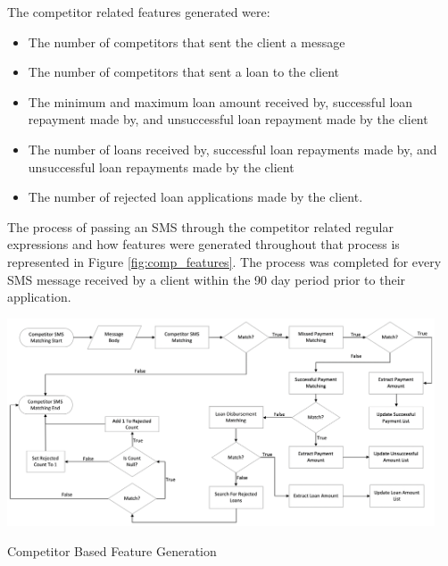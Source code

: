 \vspace{15pt}

\newpage

The competitor related features generated were:

\begin{itemize}
    \item The number of competitors that sent the client a message
    \item The number of competitors that sent a loan to the client
    \item The minimum and maximum loan amount received by, successful loan repayment made by, and unsuccessful loan repayment made by the client
    \item The number of loans received by, successful loan repayments made by, and unsuccessful loan repayments made by the client
    \item The number of rejected loan applications made by the client. 
\end{itemize}

\vspace{15pt}

The process of passing an SMS through the competitor related regular expressions and how features were generated throughout that process is represented in Figure \ref{fig:comp_features}. The process was completed for every SMS message received by a client within the 90 day period prior to their application. 

\vspace{15pt}

\begin{Figure}[!htb]
\centering
\includegraphics[width=0.95\textwidth]{images/comp_feats.png}
\caption{Competitor Based Feature Generation}
\label{fig:comp_features}
\end{Figure}

\vspace{15pt}


